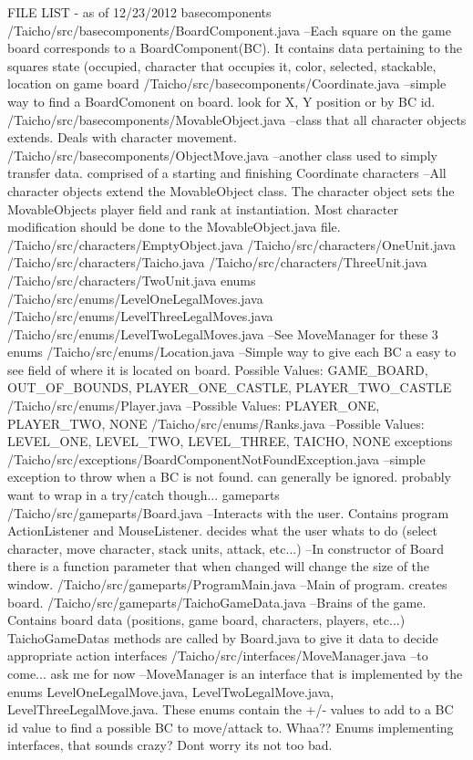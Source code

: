 F\-I\-L\-E L\-I\-S\-T -\/ as of 12/23/2012 basecomponents /\-Taicho/src/basecomponents/\-Board\-Component.java --Each square on the game board corresponds to a Board\-Component(\-B\-C). It contains data pertaining to the squares state (occupied, character that occupies it, color, selected, stackable, location on game board /\-Taicho/src/basecomponents/\-Coordinate.java --simple way to find a Board\-Comonent on board. look for X, Y position or by B\-C id. /\-Taicho/src/basecomponents/\-Movable\-Object.java --class that all character objects extends. Deals with character movement. /\-Taicho/src/basecomponents/\-Object\-Move.java --another class used to simply transfer data. comprised of a starting and finishing Coordinate characters --All character objects extend the Movable\-Object class. The character object sets the Movable\-Objects player field and rank at instantiation. Most character modification should be done to the Movable\-Object.\-java file. /\-Taicho/src/characters/\-Empty\-Object.java /\-Taicho/src/characters/\-One\-Unit.java /\-Taicho/src/characters/\-Taicho.java /\-Taicho/src/characters/\-Three\-Unit.java /\-Taicho/src/characters/\-Two\-Unit.java enums /\-Taicho/src/enums/\-Level\-One\-Legal\-Moves.java /\-Taicho/src/enums/\-Level\-Three\-Legal\-Moves.java /\-Taicho/src/enums/\-Level\-Two\-Legal\-Moves.java --See Move\-Manager for these 3 enums /\-Taicho/src/enums/\-Location.java --Simple way to give each B\-C a easy to see field of where it is located on board. Possible Values\-: G\-A\-M\-E\-\_\-\-B\-O\-A\-R\-D, O\-U\-T\-\_\-\-O\-F\-\_\-\-B\-O\-U\-N\-D\-S, P\-L\-A\-Y\-E\-R\-\_\-\-O\-N\-E\-\_\-\-C\-A\-S\-T\-L\-E, P\-L\-A\-Y\-E\-R\-\_\-\-T\-W\-O\-\_\-\-C\-A\-S\-T\-L\-E /\-Taicho/src/enums/\-Player.java --Possible Values\-: P\-L\-A\-Y\-E\-R\-\_\-\-O\-N\-E, P\-L\-A\-Y\-E\-R\-\_\-\-T\-W\-O, N\-O\-N\-E /\-Taicho/src/enums/\-Ranks.java --Possible Values\-: L\-E\-V\-E\-L\-\_\-\-O\-N\-E, L\-E\-V\-E\-L\-\_\-\-T\-W\-O, L\-E\-V\-E\-L\-\_\-\-T\-H\-R\-E\-E, T\-A\-I\-C\-H\-O, N\-O\-N\-E exceptions /\-Taicho/src/exceptions/\-Board\-Component\-Not\-Found\-Exception.java --simple exception to throw when a B\-C is not found. can generally be ignored. probably want to wrap in a try/catch though... gameparts /\-Taicho/src/gameparts/\-Board.java --Interacts with the user. Contains program Action\-Listener and Mouse\-Listener. decides what the user whats to do (select character, move character, stack units, attack, etc...) --In constructor of Board there is a function parameter that when changed will change the size of the window. /\-Taicho/src/gameparts/\-Program\-Main.java --Main of program. creates board. /\-Taicho/src/gameparts/\-Taicho\-Game\-Data.java --Brains of the game. Contains board data (positions, game board, characters, players, etc...) Taicho\-Game\-Datas methods are called by Board.\-java to give it data to decide appropriate action interfaces /\-Taicho/src/interfaces/\-Move\-Manager.java --to come... ask me for now --Move\-Manager is an interface that is implemented by the enums Level\-One\-Legal\-Move.\-java, Level\-Two\-Legal\-Move.\-java, Level\-Three\-Legal\-Move.\-java. These enums contain the +/-\/ values to add to a B\-C id value to find a possible B\-C to move/attack to. Whaa?? Enums implementing interfaces, that sounds crazy? Dont worry its not too bad. 